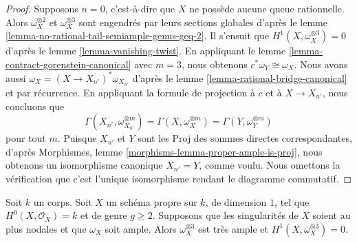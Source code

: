 \begin{proof}
\medskip\noindent
Supposons $n = 0$, c'est-à-dire que $X$ ne possède aucune queue rationnelle. Alors $\omega_X^{\otimes 2}$ et $\omega_X^{\otimes 3}$ sont engendrés par leurs sections globales d'après le lemme \ref{lemma-no-rational-tail-semiample-genus-geq-2}. Il s'ensuit que $H^1(X, \omega_X^{\otimes 3}) = 0$ d'après le lemme \ref{lemma-vanishing-twist}. En appliquant le lemme \ref{lemma-contract-gorenstein-canonical} avec $m = 3$, nous obtenons $c^*\omega_Y \cong \omega_X$. Nous avons aussi $\omega_X = (X \to X_{n'})^*\omega_{X_{n'}}$ d'après le lemme \ref{lemma-rational-bridge-canonical} et par récurrence. En appliquant la formule de projection à $c$ et à $X \to X_{n'}$, nous concluons que $$
\Gamma(X_{n'}, \omega_{X_{n'}}^{\otimes m}) =
\Gamma(X, \omega_X^{\otimes m}) =
\Gamma(Y, \omega_Y^{\otimes m})
$$ pour tout $m$. Puisque $X_{n'}$ et $Y$ sont les Proj des sommes directes correspondantes, d'après Morphismes, lemme \ref{morphisms-lemma-proper-ample-is-proj}, nous obtenons un isomorphisme canonique $X_{n'} = Y$, comme voulu. Nous omettons la vérification que c'est l'unique isomorphisme rendant le diagramme commutatif.
\end{proof}

\begin{lemma}
\label{lemma-tricanonical}
Soit $k$ un corps. Soit $X$ un schéma propre sur $k$, de dimension $1$, tel que $H^0(X, \mathcal{O}_X) = k$ et de genre $g \geq 2$. Supposons que les singularités de $X$ soient au plus nodales et que $\omega_X$ soit ample. Alors $\omega_X^{\otimes 3}$ est très ample et $H^1(X, \omega_X^{\otimes 3}) = 0$.
\end{lemma}

